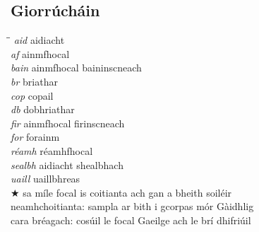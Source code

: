 \documentclass[8pt,twocolumn,openany]{extbook}
\begin{document}
\begin{frontmatter}
\chapter*{Giorr\'uch\'ain} 
\thispagestyle{empty}
\begin{tabbing}
\hspace*{12ex}\=\hspace{12ex}\=\kill
\> {\it aid} \> aidiacht \\
\> {\it af} \> ainmfhocal \\
\> {\it bain} \> ainmfhocal baininscneach \\
\> {\it br} \> briathar \\
\> {\it cop} \> copail \\
\> {\it db} \> dobhriathar \\
\> {\it fir} \> ainmfhocal firinscneach \\
\> {\it for} \> forainm \\
\> {\it réamh} \> réamhfhocal \\
\> {\it sealbh} \> aidiacht shealbhach \\
\> {\it uaill} \> uaillbhreas \\
\> $\bigstar$ \> sa míle focal is coitianta ach gan a bheith soiléir \\
\> \textdagger \> neamhchoitianta: sampla ar bith i gcorpas mór Gàidhlig \\
\> \textdbend \> cara bréagach: cosúil le focal Gaeilge ach le brí dhifriúil \\
\end{tabbing}


\newpage
\thispagestyle{empty}

\end{frontmatter}

\begin{mainmatter}
\twocolumn
{}
\lhead{\large\bf \rightmark}
\rhead{\large\bf \leftmark}

\appendix
\lhead{}
\rhead{}
\end{mainmatter}
\end{document}
